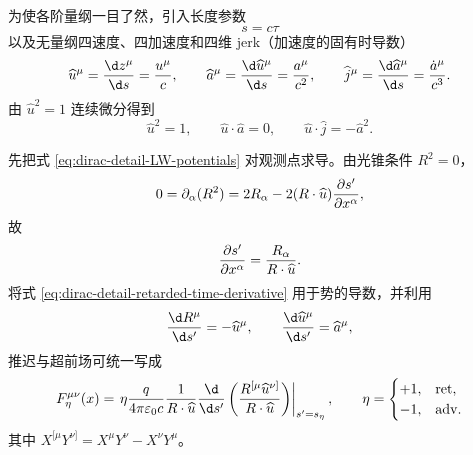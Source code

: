 为使各阶量纲一目了然，引入长度参数
\begin{equation*}
 s=c\tau
\end{equation*}
以及无量纲四速度、四加速度和四维 jerk（加速度的固有时导数）
\begin{equation}
 \widehat u^\mu={\d z^\mu\over\d s}={u^\mu\over c},
 \qquad
 \widehat a^\mu={\d \widehat u^\mu\over\d s}={a^\mu\over c^2},
 \qquad
 \widehat j^\mu={\d \widehat a^\mu\over\d s}={\dot a^\mu\over c^3}.
 \label{eq:dirac-detail-normalized-kinematics}
\end{equation}
由 $\widehat u^2=1$ 连续微分得到
\begin{equation}
 \widehat u^2=1,
 \qquad
 \widehat u\cdot \widehat a=0,
 \qquad
 \widehat u\cdot \widehat j=-\widehat a^2.
 \label{eq:dirac-detail-kinematic-identities}
\end{equation}

先把式 \eqref{eq:dirac-detail-LW-potentials} 对观测点求导。由光锥条件 $R^2=0$，
\begin{equation*}
 0=\partial_\alpha(R^2)
 =2R_\alpha-2(R\cdot \widehat u){\partial s'\over\partial x^\alpha},
\end{equation*}
故
\begin{equation}
 {\partial s'\over\partial x^\alpha}
 ={R_\alpha\over R\cdot \widehat u}.
 \label{eq:dirac-detail-retarded-time-derivative}
\end{equation}
将式 \eqref{eq:dirac-detail-retarded-time-derivative} 用于势的导数，并利用
\begin{equation*}
 {\d R^\mu\over\d s'}=-\widehat u^\mu,
 \qquad
 {\d \widehat u^\mu\over\d s'}=\widehat a^\mu,
\end{equation*}
推迟与超前场可统一写成
\begin{equation}
 F_\eta^{\mu\nu}(x)
 =\left.
 \eta{q\over4\pi\varepsilon_0c}
 {1\over R\cdot \widehat u}{\d\over\d s'}
 \left({R^{[\mu}\widehat u^{\nu]}\over R\cdot \widehat u}\right)
 \right|_{s'=s_\eta},
 \qquad
 \eta=\begin{cases}+1,&\mathrm{ret},\\-1,&\mathrm{adv}.
 \end{cases}
 \label{eq:dirac-detail-exact-LW-field}
\end{equation}
其中 $X^{[\mu}Y^{\nu]}=X^\mu Y^\nu-X^\nu Y^\mu$。

